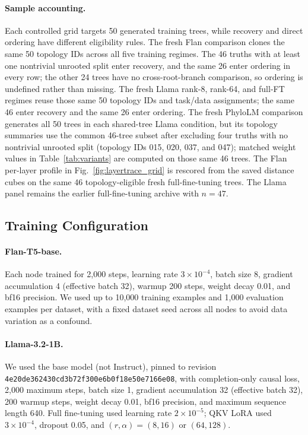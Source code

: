 \documentclass{article}
\theoremstyle{definition}
\theoremstyle{plain}
\begin{document}
\paragraph{Sample accounting.} Each controlled grid targets 50 generated training trees, while
recovery and direct ordering have different eligibility rules. The fresh Flan comparison clones the
same 50 topology IDs across all five training regimes. The 46 truths with at least one nontrivial
unrooted split enter recovery, and the same 26 enter
ordering in every row; the other 24 trees have no cross-root-branch comparison, so ordering is
undefined rather than missing. The fresh Llama rank-8, rank-64, and full-FT regimes reuse those same
50 topology IDs and task/data assignments; the same 46 enter recovery and the same 26 enter ordering.
The fresh PhyloLM comparison generates all 50 trees in each shared-tree Llama condition, but its
topology summaries use the common 46-tree subset after excluding four truths with no nontrivial
unrooted split (topology IDs 015, 020, 037, and 047); matched weight values in
Table~\ref{tab:variants} are computed on those same 46 trees.
The Flan per-layer profile in Fig.~\ref{fig:layertrace_grid} is rescored from the saved distance cubes
on the same 46 topology-eligible fresh full-fine-tuning trees. The Llama panel remains the earlier
full-fine-tuning archive with $n=47$.

\subsection*{Training Configuration}
\paragraph{Flan-T5-base.} Each node trained for 2,000 steps, learning rate $3 \times 10^{-4}$, batch size 8, gradient accumulation 4 (effective batch 32), warmup 200 steps, weight decay 0.01, and bf16 precision. We used up to 10,000 training examples and 1,000 evaluation examples per dataset, with a fixed dataset seed across all nodes to avoid data variation as a confound.

\paragraph{Llama-3.2-1B.} We used the base model (not Instruct), pinned to revision \texttt{4e20de362430cd3b72f300e6b0f18e50e7166e08}, with completion-only causal loss, 2,000 maximum steps, batch size 1, gradient accumulation 32 (effective batch 32), 200 warmup steps, weight decay 0.01, bf16 precision, and maximum sequence length 640. Full fine-tuning used learning rate $2 \times 10^{-5}$; QKV LoRA used $3 \times 10^{-4}$, dropout 0.05, and $(r,\alpha)=(8,16)$ or $(64,128)$.
\end{document}
